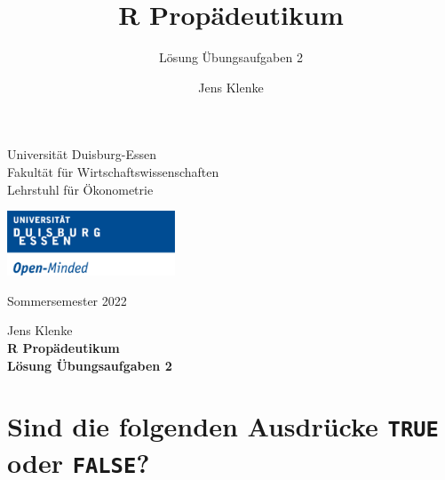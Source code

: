 \documentclass[12pt,a4paper]{article}
\title{R Propädeutikum}
\subtitle{Lösung Übungsaufgaben 2}
\author{Jens Klenke}
\date{}
\begin{document}





\restoregeometry



\begin{minipage}{0.6\textwidth}
Universität Duisburg-Essen\\
Fakultät für Wirtschaftswissenschaften\\
Lehrstuhl für Ökonometrie\\
\end{minipage}

	\begin{flushright}
	\vspace{-3cm}
	\includegraphics*[width=5cm]{includes/duelogo_en.png}\\
	\vspace{.125cm}
	\end{flushright}
\hspace{-0.005cm}Sommersemester 2022

\vspace{0.05cm}

\begin{center}
	\vspace{.25cm}
	Jens Klenke \hspace{.5cm}  \\
	\vspace{.25cm}
	\textbf{\Large{R Propädeutikum}}\\
	\vspace{.25cm}
	\textbf{\large{Lösung Übungsaufgaben 2}}\\
	\vspace{.125cm}
\end{center}





\hypertarget{sind-die-folgenden-ausdruxfccke-true-oder-false}{%
\section{\texorpdfstring{Sind die folgenden Ausdrücke \texttt{TRUE} oder
\texttt{FALSE}?}{Sind die folgenden Ausdrücke TRUE oder FALSE?}}\label{sind-die-folgenden-ausdruxfccke-true-oder-false}}
\end{document}
